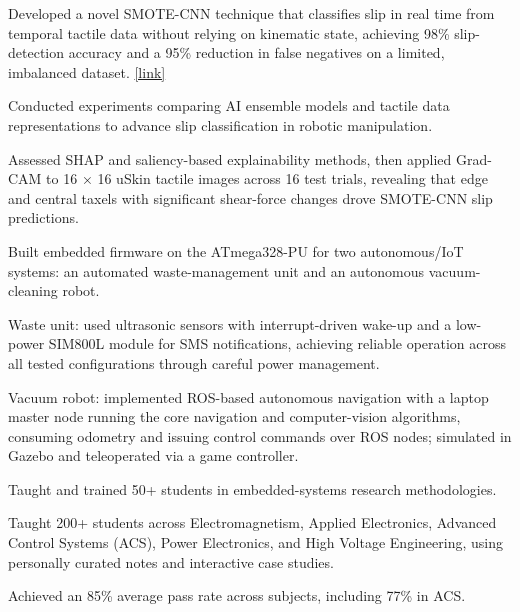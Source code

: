 \begin{details}
    \item Developed a novel SMOTE-CNN technique that classifies slip in real time from temporal tactile data without relying on kinematic state, achieving 98\% slip-detection accuracy and a 95\% reduction in false negatives on a limited, imbalanced dataset. \href{https://github.com/nelsonifechukwu/NELSON_IML_WORK}{[link]}
    \item Conducted experiments comparing AI ensemble models and tactile data representations to advance slip classification in robotic manipulation.
    \item Assessed SHAP and saliency-based explainability methods, then applied Grad-CAM to 16 × 16 uSkin tactile images across 16 test trials, revealing that edge and central taxels with significant shear-force changes drove SMOTE-CNN slip predictions.
\end{details}

\begin{details}
    \item Built embedded firmware on the ATmega328-PU for two autonomous/IoT systems: an automated waste-management unit and an autonomous vacuum-cleaning robot.
    \item Waste unit: used ultrasonic sensors with interrupt-driven wake-up and a low-power SIM800L module for SMS notifications, achieving reliable operation across all tested configurations through careful power management.
    \item Vacuum robot: implemented ROS-based autonomous navigation with a laptop master node running the core navigation and computer-vision algorithms, consuming odometry and issuing control commands over ROS nodes; simulated in Gazebo and teleoperated via a game controller.
    \item Taught and trained 50+ students in embedded-systems research methodologies.
\end{details}

\begin{details}
    \item Taught 200+ students across Electromagnetism, Applied Electronics, Advanced Control Systems (ACS), Power Electronics, and High Voltage Engineering, using personally curated notes and interactive case studies.
    \item Achieved an 85\% average pass rate across subjects, including 77\% in ACS.
\end{details}
